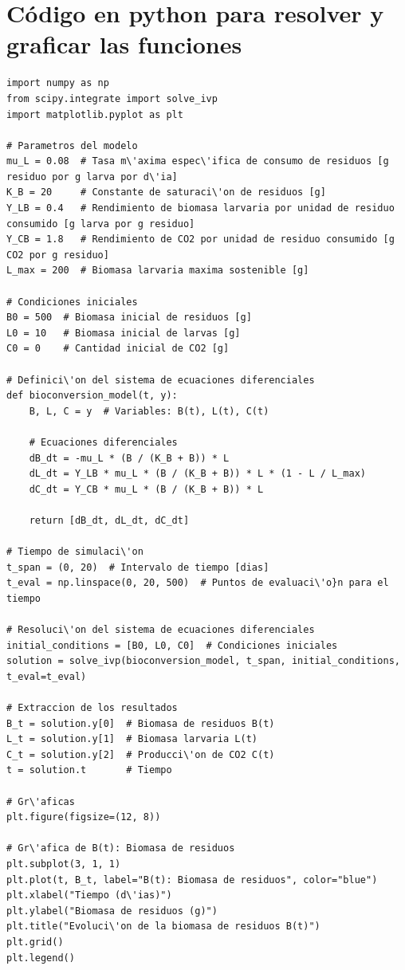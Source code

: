 \documentclass[12pt]{article}
\begin{document}
\section{Código en python para resolver y graficar las funciones}
\begin{lstlisting}[caption={Código Python para simular el modelo de bioconversión}, label={code:python}]
import numpy as np
from scipy.integrate import solve_ivp
import matplotlib.pyplot as plt

# Parametros del modelo
mu_L = 0.08  # Tasa m\'axima espec\'ifica de consumo de residuos [g residuo por g larva por d\'ia]
K_B = 20     # Constante de saturaci\'on de residuos [g]
Y_LB = 0.4   # Rendimiento de biomasa larvaria por unidad de residuo consumido [g larva por g residuo]
Y_CB = 1.8   # Rendimiento de CO2 por unidad de residuo consumido [g CO2 por g residuo]
L_max = 200  # Biomasa larvaria maxima sostenible [g]

# Condiciones iniciales
B0 = 500  # Biomasa inicial de residuos [g]
L0 = 10   # Biomasa inicial de larvas [g]
C0 = 0    # Cantidad inicial de CO2 [g]

# Definici\'on del sistema de ecuaciones diferenciales
def bioconversion_model(t, y):
    B, L, C = y  # Variables: B(t), L(t), C(t)

    # Ecuaciones diferenciales
    dB_dt = -mu_L * (B / (K_B + B)) * L
    dL_dt = Y_LB * mu_L * (B / (K_B + B)) * L * (1 - L / L_max)
    dC_dt = Y_CB * mu_L * (B / (K_B + B)) * L

    return [dB_dt, dL_dt, dC_dt]

# Tiempo de simulaci\'on
t_span = (0, 20)  # Intervalo de tiempo [dias]
t_eval = np.linspace(0, 20, 500)  # Puntos de evaluaci\'o}n para el tiempo

# Resoluci\'on del sistema de ecuaciones diferenciales
initial_conditions = [B0, L0, C0]  # Condiciones iniciales
solution = solve_ivp(bioconversion_model, t_span, initial_conditions, t_eval=t_eval)

# Extraccion de los resultados
B_t = solution.y[0]  # Biomasa de residuos B(t)
L_t = solution.y[1]  # Biomasa larvaria L(t)
C_t = solution.y[2]  # Producci\'on de CO2 C(t)
t = solution.t       # Tiempo

# Gr\'aficas
plt.figure(figsize=(12, 8))

# Gr\'afica de B(t): Biomasa de residuos
plt.subplot(3, 1, 1)
plt.plot(t, B_t, label="B(t): Biomasa de residuos", color="blue")
plt.xlabel("Tiempo (d\'ias)")
plt.ylabel("Biomasa de residuos (g)")
plt.title("Evoluci\'on de la biomasa de residuos B(t)")
plt.grid()
plt.legend()


\end{lstlisting}
\end{document}
